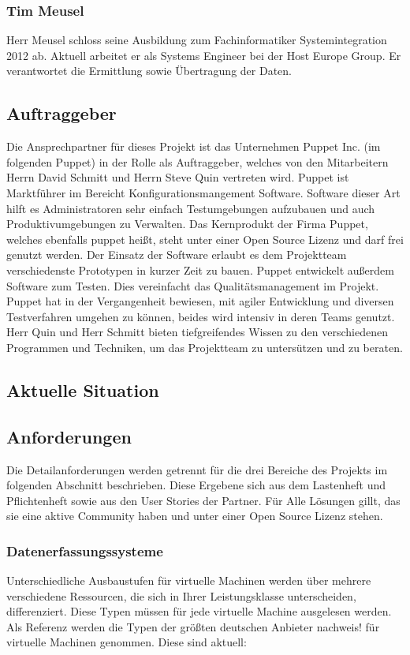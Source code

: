 \subsubsection{Tim Meusel}
Herr Meusel schloss seine Ausbildung zum Fachinformatiker Systemintegration
2012 ab. Aktuell arbeitet er als Systems Engineer bei der Host Europe Group.
Er verantwortet die Ermittlung sowie Übertragung der Daten.
\tm%

\subsection{Auftraggeber}
Die Ansprechpartner für dieses Projekt ist das Unternehmen Puppet Inc. (im
folgenden Puppet) in der Rolle als Auftraggeber, welches von den Mitarbeitern
Herrn David Schmitt und Herrn Steve Quin vertreten wird. Puppet ist Marktführer
im Bereicht Konfigurationsmangement Software. Software dieser Art hilft es
Administratoren sehr einfach Testumgebungen aufzubauen und auch
Produktivumgebungen zu Verwalten. Das Kernprodukt der Firma Puppet, welches
ebenfalls puppet heißt, steht unter einer Open Source Lizenz und darf frei
genutzt werden. Der Einsatz der Software erlaubt es dem Projektteam
verschiedenste Prototypen in kurzer Zeit zu bauen. Puppet entwickelt außerdem
Software zum Testen. Dies vereinfacht das Qualitätsmanagement im Projekt.
Puppet hat in der Vergangenheit bewiesen, mit agiler Entwicklung und diversen
Testverfahren umgehen zu können, beides wird intensiv in deren Teams genutzt.
Herr Quin und Herr Schmitt bieten tiefgreifendes Wissen zu den verschiedenen
Programmen und Techniken, um das Projektteam zu untersützen und zu beraten.
\tm%

\subsection{Aktuelle Situation}

\subsection{Anforderungen}
Die Detailanforderungen werden getrennt für die drei Bereiche des Projekts im
folgenden Abschnitt beschrieben. Diese Ergebene sich aus dem Lastenheft und
Pflichtenheft sowie aus den User Stories der Partner. Für Alle Lösungen gillt,
das sie eine aktive Community haben und unter einer Open Source Lizenz stehen.
\tm%

\subsubsection{Datenerfassungssysteme}
Unterschiedliche Ausbaustufen für virtuelle Machinen werden über mehrere
verschiedene Ressourcen, die sich in Ihrer Leistungsklasse unterscheiden,
differenziert. Diese Typen müssen für jede virtuelle Machine ausgelesen werden.
Als Referenz werden die Typen der größten deutschen Anbieter nachweis! für
virtuelle Machinen genommen. Diese sind aktuell:

